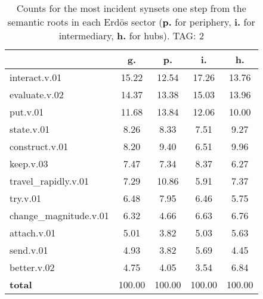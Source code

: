 \begin{table}[h!]
\begin{center}
\begin{tabular}{| l | c | c | c | c |}\hline
 & g. & p. & i. & h. \\\hline
interact.v.01 & 15.22  & 12.54  & 17.26  & 13.76 \\\hline
evaluate.v.02 & 14.37  & 13.38  & 15.03  & 13.96 \\\hline
put.v.01 & 11.68  & 13.84  & 12.06  & 10.00 \\\hline
state.v.01 & 8.26  & 8.33  & 7.51  & 9.27 \\\hline
construct.v.01 & 8.20  & 9.40  & 6.51  & 9.96 \\\hline
keep.v.03 & 7.47  & 7.34  & 8.37  & 6.27 \\\hline
travel\_rapidly.v.01 & 7.29  & 10.86  & 5.91  & 7.37 \\\hline
try.v.01 & 6.48  & 7.95  & 6.46  & 5.75 \\\hline
change\_magnitude.v.01 & 6.32  & 4.66  & 6.63  & 6.76 \\\hline
attach.v.01 & 5.01  & 3.82  & 5.03  & 5.63 \\\hline
send.v.01 & 4.93  & 3.82  & 5.69  & 4.45 \\\hline
better.v.02 & 4.75  & 4.05  & 3.54  & 6.84 \\\hline
{{\bf total}} & 100.00  & 100.00  & 100.00  & 100.00 \\\hline
\end{tabular}
\caption{Counts for the most incident synsets one step from the semantic roots in each Erd\"os sector ({\bf p.} for periphery, {\bf i.} for intermediary, {\bf h.} for hubs). TAG: 2}
\end{center}
\end{table}